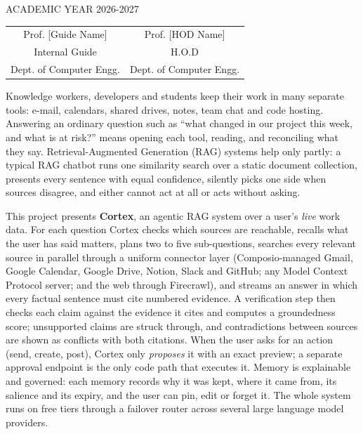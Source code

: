 \documentclass[oneside,a4paper,12pt]{report}
\providecommand{\frontmatter}{}                              %
\begin{document}
 \begin{center}
 ACADEMIC YEAR 2026-2027
 \end{center}

 \vspace*{1\baselineskip} %
 \begin{tabular}{c c }
Prof. [Guide Name] &  \hspace{50 mm} Prof. [HOD Name] \\
Internal Guide   &  \hspace{50 mm} H.O.D \\
Dept. of Computer Engg.  &	\hspace{50 mm}Dept. of Computer Engg.  \\
\end{tabular}
\newpage

\setcounter{page}{0}
\frontmatter
{}
\rfoot{\thepage}


{   \setlength{\parindent}{11mm} }
{ \setlength{\parindent}{0mm} }
Knowledge workers, developers and students keep their work in many separate tools: e-mail, calendars, shared drives, notes, team chat and code hosting. Answering an ordinary question such as ``what changed in our project this week, and what is at risk?'' means opening each tool, reading, and reconciling what they say. Retrieval-Augmented Generation (RAG) systems help only partly: a typical RAG chatbot runs one similarity search over a static document collection, presents every sentence with equal confidence, silently picks one side when sources disagree, and either cannot act at all or acts without asking.

\vspace*{0.5\baselineskip}
This project presents \textbf{Cortex}, an agentic RAG system over a user's \emph{live} work data. For each question Cortex checks which sources are reachable, recalls what the user has said matters, plans two to five sub-questions, searches every relevant source in parallel through a uniform connector layer (Composio-managed Gmail, Google Calendar, Google Drive, Notion, Slack and GitHub; any Model Context Protocol server; and the web through Firecrawl), and streams an answer in which every factual sentence must cite numbered evidence. A verification step then checks each claim against the evidence it cites and computes a groundedness score; unsupported claims are struck through, and contradictions between sources are shown as conflicts with both citations. When the user asks for an action (send, create, post), Cortex only \emph{proposes} it with an exact preview; a separate approval endpoint is the only code path that executes it. Memory is explainable and governed: each memory records why it was kept, where it came from, its salience and its expiry, and the user can pin, edit or forget it. The whole system runs on free tiers through a failover router across several large language model providers.
\end{document}
